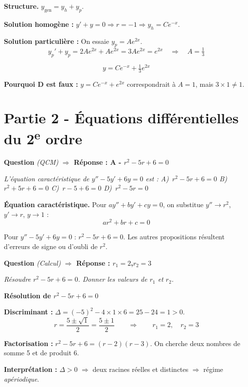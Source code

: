 \documentclass[11pt,a4paper]{article}
\newcounter{qnum}
\newcommand{\qtitre}[2]{%
  \stepcounter{qnum}%
  \medskip\noindent
  \textbf{\color{bleutexte}Question \theqnum}\enspace
  \textit{(#1)}\enspace
  \textcolor{vertok}{\textbf{$\Rightarrow$ Réponse : #2}}
  \par\smallskip
}
\newcommand{\qenonce}[1]{%
  \begin{mdframed}[backgroundcolor=grisbox, linewidth=0pt,
    innerleftmargin=8pt, innerrightmargin=8pt,
    innertopmargin=5pt, innerbottommargin=5pt,
    skipabove=2pt, skipbelow=4pt]
  \small\textit{#1}
  \end{mdframed}
}
\begin{document}
\begin{methodebox}
\textbf{Structure.} $y_{\text{gen}} = y_h + y_p$.
\end{methodebox}

\textbf{Solution homogène :} $y' + y = 0 \Rightarrow r = -1 \Rightarrow y_h = Ce^{-x}$.

\textbf{Solution particulière :} On essaie $y_p = Ae^{2x}$.
$$y_p' + y_p = 2Ae^{2x} + Ae^{2x} = 3Ae^{2x} = e^{2x} \quad\Rightarrow\quad A = \tfrac{1}{3}$$

$$\boxed{y = Ce^{-x} + \tfrac{1}{3}e^{2x}}$$

\textbf{Pourquoi D est faux :} $y = Ce^{-x} + e^{2x}$ correspondrait à $A = 1$, mais $3\times 1 \neq 1$.

\section{Partie 2 - Équations différentielles du 2\textsuperscript{e} ordre}

\qtitre{QCM}{A - $r^2 - 5r + 6 = 0$}
\qenonce{L'équation caractéristique de $y'' - 5y' + 6y = 0$ est :
\quad A)~$r^2-5r+6=0$ \quad B)~$r^2+5r+6=0$ \quad C)~$r-5+6=0$ \quad D)~$r^2-5r=0$}

\begin{methodebox}
\textbf{Équation caractéristique.} Pour $ay'' + by' + cy = 0$, on substitue $y'' \to r^2$, $y' \to r$, $y \to 1$ :
$$ar^2 + br + c = 0$$
\end{methodebox}

Pour $y'' - 5y' + 6y = 0$ : $r^2 - 5r + 6 = 0$. Les autres propositions résultent d'erreurs de signe ou d'oubli de $r^2$.

\qtitre{Calcul}{$r_1 = 2$,\quad $r_2 = 3$}
\qenonce{Résoudre $r^2 - 5r + 6 = 0$. Donner les valeurs de $r_1$ et $r_2$.}

\begin{reponsebox}
\textbf{Résolution de $r^2 - 5r + 6 = 0$}

\textbf{Discriminant :} $\Delta = (-5)^2 - 4\times 1\times 6 = 25 - 24 = 1 > 0$.
$$r = \frac{5 \pm \sqrt{1}}{2} = \frac{5 \pm 1}{2} \qquad\Rightarrow\qquad \boxed{r_1 = 2,\quad r_2 = 3}$$

\textbf{Factorisation :} $r^2 - 5r + 6 = (r-2)(r-3)$. On cherche deux nombres de somme 5 et de produit 6.

\textbf{Interprétation :} $\Delta > 0$ $\Rightarrow$ deux racines réelles et distinctes $\Rightarrow$ régime \emph{apériodique}.
\end{reponsebox}
\end{document}
